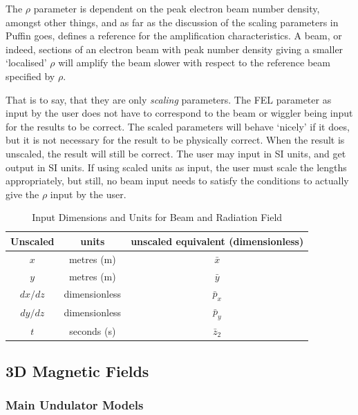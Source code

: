 \documentclass[12pt]{article}%
\begin{document}
The $\rho$ parameter is dependent on the peak electron beam number density, amongst other things, and as far as the discussion of the scaling parameters in Puffin goes, defines a reference for the amplification characteristics. A beam, or indeed, sections of an electron beam with peak number density giving a smaller `localised' $\rho$ will amplify the beam slower with respect to the reference beam specified by $\rho$.

That is to say, that they are only \textit{scaling} parameters. The FEL parameter as input by the user does not have to correspond to the beam or wiggler being input for the results to be correct. The scaled parameters will behave `nicely' if it does, but it is not necessary for the result to be physically correct. When the result is unscaled, the result will still be correct. The user may input in SI units, and get output in SI units. If using scaled units as input, the user must scale the lengths appropriately, but still, no beam input needs to satisfy the conditions to actually give the $\rho$ input by the user.






\begin{table}
\centering
\caption[Input Units]{Input Dimensions and Units for Beam and Radiation Field}
\begin{tabular}{|  c   | c  |   c   |}
\hline
Unscaled & units & unscaled equivalent (dimensionless) \\
\hline
$x$ & metres (m) & $\bar{x}$ \\
\hline
$y$ & metres (m) & $\bar{y}$ \\
\hline
$dx/dz$ & dimensionless & $\bar{p}_x$ \\
\hline
$dy/dz$ & dimensionless & $\bar{p}_y$ \\
\hline
$t$ & seconds (s) & $\bar{z}_2$ \\
\hline
\end{tabular}
\label{table}
\vspace*{-\baselineskip}
\end{table}



\subsection{3D Magnetic Fields}

\subsubsection{Main Undulator Models}
\end{document}
